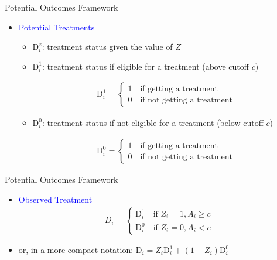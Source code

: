 \documentclass[dvipsnames,hyperref={pdfpagelabels=false}]{beamer}
\begin{document}
\begin{frame}{Potential Outcomes Framework}
	\begin{itemize}
		
		\item \textcolor{blue}{Potential Treatments}
		\vspace{0.2cm}
		\begin{itemize}
			\item $\mathrm{D}^{z}_{i}$: treatment status given the value of $Z$
			\vspace{0.2cm}
			\item $\mathrm{D}^{1}_{i}$: treatment status if eligible for a treatment (above cutoff $c$)
			\vspace{0.2cm}
			
			\begin{align*}
				\mathrm{D}^{1}_{i}=\left\lbrace
				\begin{array}{l}
					1\quad \text{if getting a treatment}\\
					0\quad \text{if not getting a treatment}
				\end{array}\right.
			\end{align*}		
			
			
			\item $\mathrm{D}^{0}_{i}$: treatment status if not eligible for a treatment (below cutoff $c$)
			
			\begin{align*}
				\mathrm{D}^{0}_{i}=\left\lbrace
				\begin{array}{l}
					1\quad \text{if getting a treatment}\\
					0\quad \text{if not getting a treatment}
				\end{array}\right.
			\end{align*}		
			
			
		\end{itemize}
		
	\end{itemize}
\end{frame}






\begin{frame}{Potential Outcomes Framework}
	\begin{itemize}
		
		\item \textcolor{blue}{Observed Treatment}
		\begin{align*}
			D_{i}=\left\lbrace
			\begin{array}{l}
				\mathrm{D}^{1}_{i}\quad \text{if $Z_{i}=1, A_i\geq c$} \\
				\mathrm{D}^{0}_{i}\quad \text{if $Z_{i}=0, A_i< c$}
			\end{array}\right.
		\end{align*}
		\item or, in a more compact notation: 
		$\mathrm{D}_{i}=Z_{i}\mathrm{D}^{1}_{i}+(1-Z_{i})\mathrm{D}^{0}_{i} $
		
	\end{itemize}
\end{frame}
\end{document}
